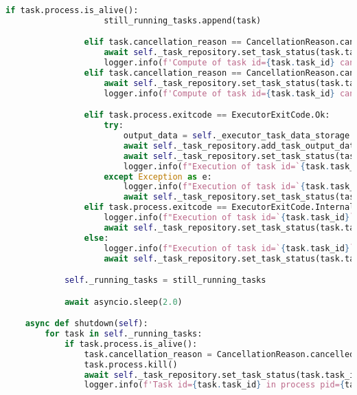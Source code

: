 \begin{lstlisting}[language=Python, caption=execution/listener.py, captionpos=b]
                if task.process.is_alive():
                    still_running_tasks.append(task)

                elif task.cancellation_reason == CancellationReason.cancelled_by_timeout_limit:
                    await self._task_repository.set_task_status(task.task_id, TaskStatus.CANCELLED)
                    logger.info(f'Compute of task id={task.task_id} cancelled by time limit.')
                elif task.cancellation_reason == CancellationReason.cancelled_by_user:
                    await self._task_repository.set_task_status(task.task_id, TaskStatus.CANCELLED)
                    logger.info(f'Compute of task id={task.task_id} cancelled by user.')

                elif task.process.exitcode == ExecutorExitCode.Ok:
                    try:
                        output_data = self._executor_task_data_storage.get_output_data(task.task_id, task.method_name)
                        await self._task_repository.add_task_output_data(task.task_id, output_data)
                        await self._task_repository.set_task_status(task.task_id, TaskStatus.SUCCESS)
                        logger.info(f"Execution of task id=`{task.task_id}` is completed successfully.")
                    except Exception as e:
                        logger.info(f"Execution of task id=`{task.task_id}` is failed by I/O error: {e}.")
                        await self._task_repository.set_task_status(task.task_id, TaskStatus.FAILURE)
                elif task.process.exitcode == ExecutorExitCode.InternalErr:
                    logger.info(f"Execution of task id=`{task.task_id}` is failed by internal error.")
                    await self._task_repository.set_task_status(task.task_id, TaskStatus.FAILURE)
                else:
                    logger.info(f"Execution of task id=`{task.task_id}` is failed.")
                    await self._task_repository.set_task_status(task.task_id, TaskStatus.FAILURE)

            self._running_tasks = still_running_tasks

            await asyncio.sleep(2.0)

    async def shutdown(self):
        for task in self._running_tasks:
            if task.process.is_alive():
                task.cancellation_reason = CancellationReason.cancelled_by_system_shutdown
                task.process.kill()
                await self._task_repository.set_task_status(task.task_id, TaskStatus.CANCELLED)
                logger.info(f'Task id={task.task_id} in process pid={task.process.pid} cancelled by system shutdown.')


\end{lstlisting}
